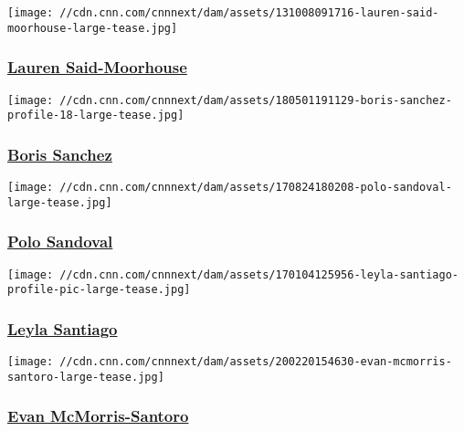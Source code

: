 \href{/profiles/lauren-moorhouse}{}

\texttt{[image: //cdn.cnn.com/cnnnext/dam/assets/131008091716-lauren-said-moorhouse-large-tease.jpg]}

\hypertarget{lauren-said-moorhouse}{%
\subsubsection{\texorpdfstring{\href{/profiles/lauren-moorhouse}{Lauren
Said-Moorhouse}}{Lauren Said-Moorhouse}}\label{lauren-said-moorhouse}}

\href{/profiles/boris-sanchez-profile}{}

\texttt{[image: //cdn.cnn.com/cnnnext/dam/assets/180501191129-boris-sanchez-profile-18-large-tease.jpg]}

\hypertarget{boris-sanchez}{%
\subsubsection{\texorpdfstring{\href{/profiles/boris-sanchez-profile}{Boris
Sanchez}}{Boris Sanchez}}\label{boris-sanchez}}

\href{/profiles/polo-sandoval-profile}{}

\texttt{[image: //cdn.cnn.com/cnnnext/dam/assets/170824180208-polo-sandoval-large-tease.jpg]}

\hypertarget{polo-sandoval}{%
\subsubsection{\texorpdfstring{\href{/profiles/polo-sandoval-profile}{Polo
Sandoval}}{Polo Sandoval}}\label{polo-sandoval}}

\href{/profiles/leyla-santiago-profile}{}

\texttt{[image: //cdn.cnn.com/cnnnext/dam/assets/170104125956-leyla-santiago-profile-pic-large-tease.jpg]}

\hypertarget{leyla-santiago}{%
\subsubsection{\texorpdfstring{\href{/profiles/leyla-santiago-profile}{Leyla
Santiago}}{Leyla Santiago}}\label{leyla-santiago}}

\href{/profiles/evan-mcmorris-santoro}{}

\texttt{[image: //cdn.cnn.com/cnnnext/dam/assets/200220154630-evan-mcmorris-santoro-large-tease.jpg]}

\hypertarget{evan-mcmorris-santoro}{%
\subsubsection{\texorpdfstring{\href{/profiles/evan-mcmorris-santoro}{Evan
McMorris-Santoro}}{Evan McMorris-Santoro}}\label{evan-mcmorris-santoro}}

